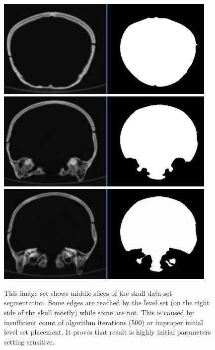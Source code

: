 \begin{figure}
    \centering
    \includegraphics[width=0.95\textwidth]{data/png/12}
    \includegraphics[width=0.95\textwidth]{data/png/17}
    \includegraphics[width=0.95\textwidth]{data/png/18}
    \caption[Result of segmentation middle slices of the skull data set]
{
This image set shows middle slices of the skull data set segmentation.
Some edges are reached by the level set (on the right side of the skull mostly) while some are not.
This is caused by insufficient count of algorithm iterations (500) or improper initial level set placement.
It proves that result is highly initial parameters setting sensitive.
}
    \label{fg:middleSlicesSegmentation}
\end{figure}

